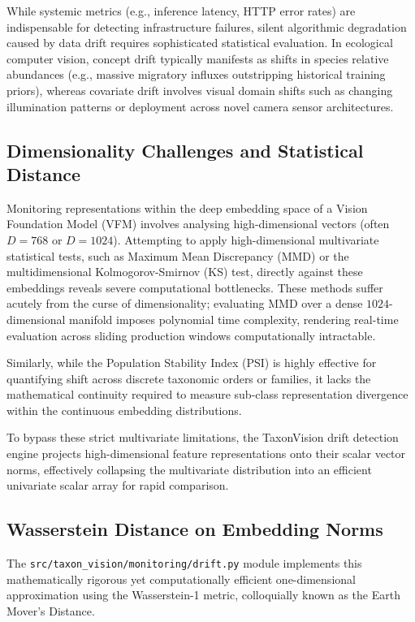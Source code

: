 While systemic metrics (e.g., inference latency, HTTP error rates) are indispensable for detecting infrastructure failures, silent algorithmic degradation caused by data drift requires sophisticated statistical evaluation. In ecological computer vision, concept drift typically manifests as shifts in species relative abundances (e.g., massive migratory influxes outstripping historical training priors), whereas covariate drift involves visual domain shifts such as changing illumination patterns or deployment across novel camera sensor architectures.

\subsection{Dimensionality Challenges and Statistical Distance}

Monitoring representations within the deep embedding space of a Vision Foundation Model (VFM) involves analysing high-dimensional vectors (often $D=768$ or $D=1024$). Attempting to apply high-dimensional multivariate statistical tests, such as Maximum Mean Discrepancy (MMD) or the multidimensional Kolmogorov-Smirnov (KS) test, directly against these embeddings reveals severe computational bottlenecks. These methods suffer acutely from the curse of dimensionality; evaluating MMD over a dense $1024$-dimensional manifold imposes polynomial time complexity, rendering real-time evaluation across sliding production windows computationally intractable.

Similarly, while the Population Stability Index (PSI) is highly effective for quantifying shift across discrete taxonomic orders or families, it lacks the mathematical continuity required to measure sub-class representation divergence within the continuous embedding distributions.

To bypass these strict multivariate limitations, the TaxonVision drift detection engine projects high-dimensional feature representations onto their scalar vector norms, effectively collapsing the multivariate distribution into an efficient univariate scalar array for rapid comparison.

\subsection{Wasserstein Distance on Embedding Norms}

The \texttt{src/taxon\_vision/monitoring/drift.py} module implements this mathematically rigorous yet computationally efficient one-dimensional approximation using the Wasserstein-1 metric, colloquially known as the Earth Mover's Distance.

